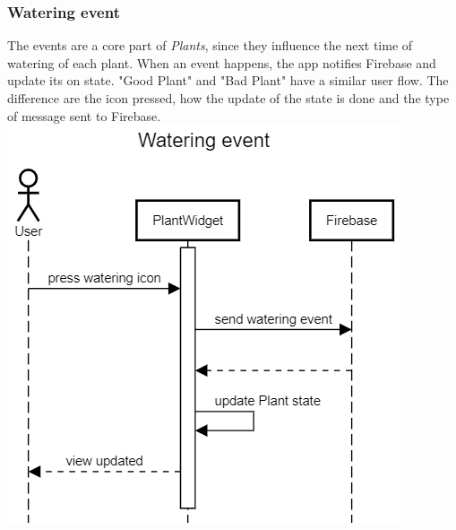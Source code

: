\documentclass[10pt]{article}
\begin{document}
	\subsubsection{Watering event}
	The events are a core part of \textit{Plants}, since they influence the next time of watering of each plant. When an event happens, the app notifies Firebase and update its on state.
	"Good Plant" and "Bad Plant" have a similar user flow. The difference are the icon pressed, how the update of the state is done and the type of message sent to Firebase.
	\newline
	\newline
	\newline
	\includegraphics[scale=0.40]{resources/WateringEvent.png}
	\newpage
\end{document}
